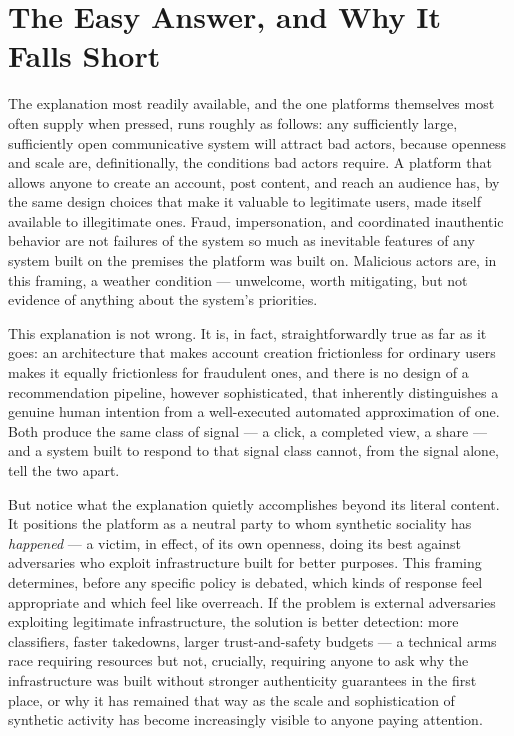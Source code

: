\documentclass[12pt,a4paper]{book}
\begin{document}
\section{The Easy Answer, and Why It Falls Short}

The explanation most readily available, and the one platforms themselves most often supply when pressed, runs roughly as follows: any sufficiently large, sufficiently open communicative system will attract bad actors, because openness and scale are, definitionally, the conditions bad actors require. A platform that allows anyone to create an account, post content, and reach an audience has, by the same design choices that make it valuable to legitimate users, made itself available to illegitimate ones. Fraud, impersonation, and coordinated inauthentic behavior are not failures of the system so much as inevitable features of any system built on the premises the platform was built on. Malicious actors are, in this framing, a weather condition — unwelcome, worth mitigating, but not evidence of anything about the system's priorities.

This explanation is not wrong. It is, in fact, straightforwardly true as far as it goes: an architecture that makes account creation frictionless for ordinary users makes it equally frictionless for fraudulent ones, and there is no design of a recommendation pipeline, however sophisticated, that inherently distinguishes a genuine human intention from a well-executed automated approximation of one. Both produce the same class of signal — a click, a completed view, a share — and a system built to respond to that signal class cannot, from the signal alone, tell the two apart.

But notice what the explanation quietly accomplishes beyond its literal content. It positions the platform as a neutral party to whom synthetic sociality has \emph{happened} — a victim, in effect, of its own openness, doing its best against adversaries who exploit infrastructure built for better purposes. This framing determines, before any specific policy is debated, which kinds of response feel appropriate and which feel like overreach. If the problem is external adversaries exploiting legitimate infrastructure, the solution is better detection: more classifiers, faster takedowns, larger trust-and-safety budgets — a technical arms race requiring resources but not, crucially, requiring anyone to ask why the infrastructure was built without stronger authenticity guarantees in the first place, or why it has remained that way as the scale and sophistication of synthetic activity has become increasingly visible to anyone paying attention.
\end{document}

